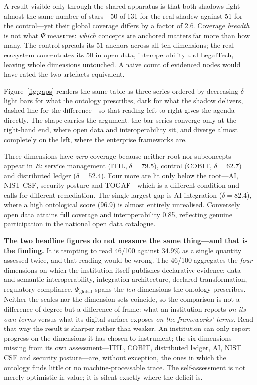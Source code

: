 \documentclass[engproc,proceedingpaper,submit,moreauthors]{Definitions/mdpi}
\begin{document}
    A result visible only through the shared apparatus is that both shadows light almost the same number of stars---50 of 131 for the real shadow against 51 for the control---yet their global coverage differs by a factor of 2.6. Coverage \emph{breadth} is not what $\Psi$ measures: \emph{which} concepts are anchored matters far more than how many. The control spreads its 51 anchors across all ten dimensions; the real ecosystem concentrates its 50 in open data, interoperability and LegalTech, leaving whole dimensions untouched. A naive count of evidenced nodes would have rated the two artefacts equivalent.

    Figure~\ref{fig:gaps} renders the same table as three series ordered by decreasing $\delta$---light bars for what the ontology prescribes, dark for what the shadow delivers, dashed line for the difference---so that reading left to right gives the agenda directly. The shape carries the argument: the bar series converge only at the right-hand end, where open data and interoperability sit, and diverge almost completely on the left, where the enterprise frameworks are.

    Three dimensions have \emph{zero} coverage because neither root nor subconcepts appear in $R$: service management (ITIL, $\delta=79.5$), control (COBIT, $\delta=62.7$) and distributed ledger ($\delta=52.4$). Four more are lit only below the root---AI, NIST CSF, security posture and TOGAF---which is a different condition and calls for different remediation. The single largest gap is AI integration ($\delta=82.4$), where a high ontological score (96.9) is almost entirely unrealised. Conversely open data attains full coverage and interoperability 0.85, reflecting genuine participation in the national open data catalogue.

    \textbf{The two headline figures do not measure the same thing---and that is the finding.} It is tempting to read 46/100 against 34.9\% as a single quantity assessed twice, and that reading would be wrong. The 46/100 aggregates the \emph{four} dimensions on which the institution itself publishes declarative evidence: data and semantic interoperability, integration architecture, declared transformation, regulatory compliance. $\Psi_{\mathrm{global}}$ spans the \emph{ten} dimensions the ontology prescribes. Neither the scales nor the dimension sets coincide, so the comparison is not a difference of degree but a difference of frame: what an institution reports \emph{on its own terms} versus what its digital surface exposes \emph{on the frameworks' terms}. Read that way the result is sharper rather than weaker. An institution can only report progress on the dimensions it has chosen to instrument; the six dimensions missing from its own assessment---ITIL, COBIT, distributed ledger, AI, NIST CSF and security posture---are, without exception, the ones in which the ontology finds little or no machine-processable trace. The self-assessment is not merely optimistic in value; it is silent exactly where the deficit is.
\end{document}
